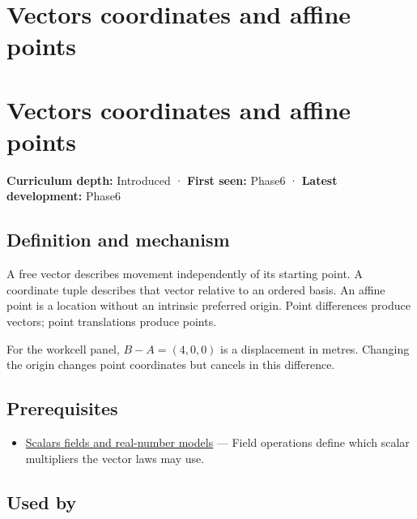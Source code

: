 \hypertarget{appendix-0659864c0aa3}{}
\section*{Vectors coordinates and affine points}
\section{Vectors coordinates and affine points}\label{vectors-coordinates-and-affine-points}

\textbf{Curriculum depth:} Introduced · \textbf{First seen:} Phase6 · \textbf{Latest development:} Phase6

\subsection{Definition and mechanism}\label{definition-and-mechanism}

A free vector describes movement independently of its starting point. A coordinate tuple describes that vector relative to an ordered basis. An affine point is a location without an intrinsic preferred origin. Point differences produce vectors; point translations produce points.

For the workcell panel, \(B-A=(4,0,0)\) is a displacement in metres. Changing the origin changes point coordinates but cancels in this difference.

\subsection{Prerequisites}\label{prerequisites}

\begin{itemize}
\tightlist
\item
  \hyperref[appendix-52051ad550fe]{Scalars fields and real-number models} --- Field operations define which scalar multipliers the vector laws may use.
\end{itemize}

\subsection{Used by}\label{used-by}

